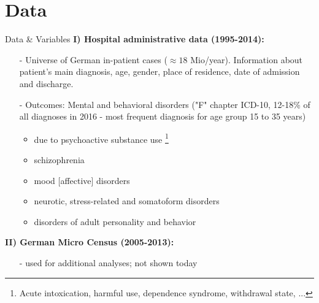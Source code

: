 \documentclass[aspectratio=169,handout]{beamer} %
\begin{document}

\section{Data}
\begin{frame}{Data \& Variables}\label{VARIABLES}
\textbf{I) Hospital administrative data (1995-2014):} 
\begin{itemize}
\item[-] Universe of German in-patient cases ($\approx 18$ Mio/year). \newline Information about patient's main diagnosis, age, gender, place of residence, date of admission and discharge.
\item[-] Outcomes: Mental and behavioral disorders ("F" chapter ICD-10, 12-18\% of all diagnoses in 2016 - most frequent diagnosis for age group 15 to 35 years) \hyperlink{ICD10 CLASSIFICATION}{}
\hyperlink{5 MOST COMMON DIAGNOSES}{}


\begin{itemize}
\item due to psychoactive substance use \footnote{Acute intoxication, harmful use, dependence syndrome, withdrawal state, ...}
\item schizophrenia
\item mood [affective] disorders
\item neurotic, stress-related and somatoform disorders
\item disorders of adult personality and behavior
\end{itemize}
\end{itemize}



 \textbf{II) German Micro Census (2005-2013):}
\begin{itemize}
\item[-] used for additional analyses; not shown today

\end{itemize} 
 

\end{frame}
\end{document}

